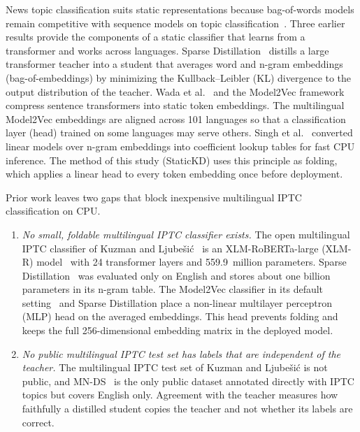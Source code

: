 \documentclass{ieeeaccess}
\begin{document}
News topic classification suits static representations because bag-of-words models remain competitive with sequence models on topic classification~\cite{galke2022bow}. Three earlier results provide the components of a static classifier that learns from a transformer and works across languages. Sparse Distillation~\cite{ye2022sparse} distills a large transformer teacher into a student that averages word and n-gram embeddings (bag-of-embeddings) by minimizing the Kullback--Leibler (KL) divergence to the output distribution of the teacher. Wada et al.~\cite{wada2025static} and the Model2Vec framework~\cite{tulkens2024model2vec} compress sentence transformers into static token embeddings. The multilingual Model2Vec embeddings are aligned across 101 languages so that a classification layer (head) trained on some languages may serve others. Singh et al.~\cite{singh2023auglinear} converted linear models over n-gram embeddings into coefficient lookup tables for fast CPU inference. The method of this study (StaticKD) uses this principle as folding, which applies a linear head to every token embedding once before deployment.

Prior work leaves two gaps that block inexpensive multilingual IPTC classification on CPU.
\begin{enumerate}
  \item \emph{No small, foldable multilingual IPTC classifier exists.} The open multilingual IPTC classifier of Kuzman and Ljube\v{s}i\'c~\cite{kuzman2025llm} is an XLM-RoBERTa-large (XLM-R) model~\cite{conneau2020xlmr} with 24 transformer layers and 559.9~million parameters. Sparse Distillation~\cite{ye2022sparse} was evaluated only on English and stores about one billion parameters in its n-gram table. The Model2Vec classifier in its default setting~\cite{tulkens2024model2vec} and Sparse Distillation place a non-linear multilayer perceptron (MLP) head on the averaged embeddings. This head prevents folding and keeps the full 256-dimensional embedding matrix in the deployed model.
  \item \emph{No public multilingual IPTC test set has labels that are independent of the teacher.} The multilingual IPTC test set of Kuzman and Ljube\v{s}i\'c is not public, and MN-DS~\cite{petukhova2023mnds} is the only public dataset annotated directly with IPTC topics but covers English only. Agreement with the teacher measures how faithfully a distilled student copies the teacher and not whether its labels are correct.
\end{enumerate}
\end{document}
